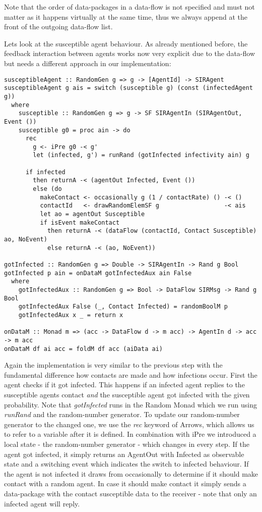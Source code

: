 Note that the order of data-packages in a data-flow is not specified and must not matter as it happens virtually at the same time, thus we always append at the front of the outgoing data-flow list.

Lets look at the susceptible agent behaviour. As already mentioned before, the feedback interaction between agents works now very explicit due to the data-flow but needs a different approach in our implementation:

\begin{verbatim}
susceptibleAgent :: RandomGen g => g -> [AgentId] -> SIRAgent
susceptibleAgent g ais = switch (susceptible g) (const (infectedAgent g))
  where
    susceptible :: RandomGen g => g -> SF SIRAgentIn (SIRAgentOut, Event ())
    susceptible g0 = proc ain -> do
      rec
        g <- iPre g0 -< g'
        let (infected, g') = runRand (gotInfected infectivity ain) g

      if infected 
        then returnA -< (agentOut Infected, Event ())
        else (do
          makeContact <- occasionally g (1 / contactRate) () -< ()
          contactId   <- drawRandomElemSF g                  -< ais
          let ao = agentOut Susceptible
          if isEvent makeContact
            then returnA -< (dataFlow (contactId, Contact Susceptible) ao, NoEvent)
            else returnA -< (ao, NoEvent))
            
gotInfected :: RandomGen g => Double -> SIRAgentIn -> Rand g Bool
gotInfected p ain = onDataM gotInfectedAux ain False
  where
    gotInfectedAux :: RandomGen g => Bool -> DataFlow SIRMsg -> Rand g Bool
    gotInfectedAux False (_, Contact Infected) = randomBoolM p
    gotInfectedAux x _ = return x
    
onDataM :: Monad m => (acc -> DataFlow d -> m acc) -> AgentIn d -> acc -> m acc
onDataM df ai acc = foldM df acc (aiData ai)
\end{verbatim}

Again the implementation is very similar to the previous step with the fundamental difference how contacts are made and how infections occur. First the agent checks if it got infected. This happens if an infected agent replies to the susceptible agents contact \textit{and} the susceptible agent got infected with the given probability. Note that \textit{gotInfected} runs in the Random Monad which we run using \textit{runRand} and the random-number generator. To update our random-number generator to the changed one, we use the \textit{rec} keyword of Arrows, which allows us to refer to a variable after it is defined. In combination with iPre we introduced a local state - the random-number generator - which changes in every step.
If the agent got infected, it simply returns an AgentOut with Infected as observable state and a switching event which indicates the switch to infected behaviour.
If the agent is not infected it draws from occasionally to determine if it should make contact with a random agent. In case it should make contact it simply sends a data-package with the contact susceptible data to the receiver - note that only an infected agent will reply.


